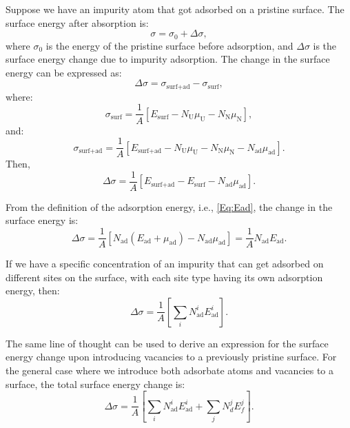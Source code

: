 \documentclass[preprint,12pt,sort&compress]{elsarticle}
\newcommand{\?}{\stackrel{?}{=}}
\providecommand{\DIFaddend}{\protect\color{black}} %
\DeclareRobustCommand{\DIFaddend}{\DIFOaddend \let\includegraphics\DIFOincludegraphics} %
\begin{document}
\DIFaddend Suppose we have an impurity atom that got adsorbed on a pristine surface. The surface energy after absorption is: 
\begin{equation}
\sigma = \sigma_0 + \Delta \sigma,
\end{equation}
where $\sigma_0$ is the energy of the pristine surface before adsorption, and $\Delta \sigma$ is the surface energy change due to impurity adsorption. The change in the surface energy can be expressed as:
\begin{equation}
\Delta \sigma = \sigma_\text{surf+ad} - \sigma_\text{surf},
\end{equation}
where:
\begin{equation}
\sigma_\text{surf} = \frac{1}{A} \left[ E_\text{surf} - N_\text{U} \mu_\text{U} - N_\text{N} \mu_\text{N} \right],
\end{equation}
and:
\begin{equation}
\sigma_\text{surf+ad} = \frac{1}{A} \left[ E_\text{surf+ad} - N_\text{U} \mu_\text{U} - N_\text{N} \mu_\text{N} - N_\text{ad} \mu_\text{ad} \right].
\end{equation}
Then,
\begin{equation}
\Delta \sigma = \frac{1}{A} \left[ E_\text{surf+ad} - E_\text{surf} - N_\text{ad} \mu_\text{ad} \right].
\end{equation}

From the definition of the adsorption energy, i.e., \cref{Eq:Ead}, the change in the surface energy is:
\begin{equation}
\Delta \sigma = \frac{1}{A} \left[ N_\text{ad} ( E_\text{ad} + \mu_\text{ad} ) - N_\text{ad} \mu_\text{ad} \right] = \frac{1}{A} N_\text{ad} E_\text{ad}. 
\end{equation}

If we have a specific concentration of an impurity that can get adsorbed on different sites on the surface, with each site type having its own adsorption energy, then:
\begin{equation}
\Delta \sigma = \frac{1}{A} \left[ \sum_i N_\text{ad}^i E_\text{ad}^i \right].
\end{equation}

The same line of thought can be used to derive an expression for the surface energy change upon introducing vacancies to a previously pristine surface. For the general case where we introduce both adsorbate atoms and vacancies to a surface, the total surface energy change is:
\begin{equation}
\Delta \sigma = \frac{1}{A} \left[ \sum_i N_\text{ad}^i E_\text{ad}^i + \sum_j N_d^j E_f^j \right].
\label{Eq:DeltaSigma}
\end{equation}
\end{document}
